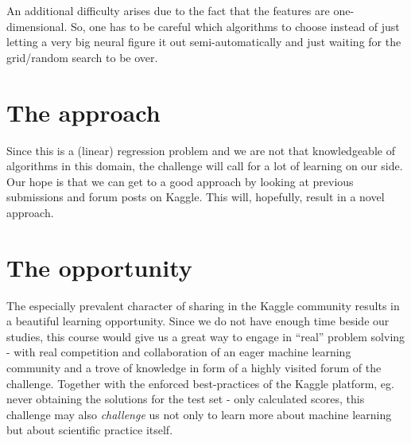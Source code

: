\documentclass[colorback,accentcolor=tud9c,12pt]{tudreport}
\begin{document}
An additional difficulty arises due to the fact that the features are one-dimensional. So, one has to be careful which algorithms to choose instead of just letting a very big neural figure it out semi-automatically and just waiting for the grid/random search to be over.

\section{The approach}
Since this is a (linear) regression problem and we are not that knowledgeable of algorithms in this domain, the challenge will call for a lot of learning on our side.
Our hope is that we can get to a good approach by looking at previous submissions and forum posts on Kaggle.
This will, hopefully, result in a novel approach.

\section{The opportunity}
The especially prevalent character of sharing in the Kaggle community results in a beautiful learning opportunity. Since we do not have enough time beside our studies, this course would give us a great way to engage in ``real'' problem solving - with real competition and collaboration of an eager machine learning community and a trove of knowledge in form of a highly visited forum of the challenge.
Together with the enforced best-practices of the Kaggle platform, eg. never obtaining the solutions for the test set - only calculated scores, this challenge may also \textit{challenge} us not only to learn more about machine learning but about scientific practice itself.
\end{document}
